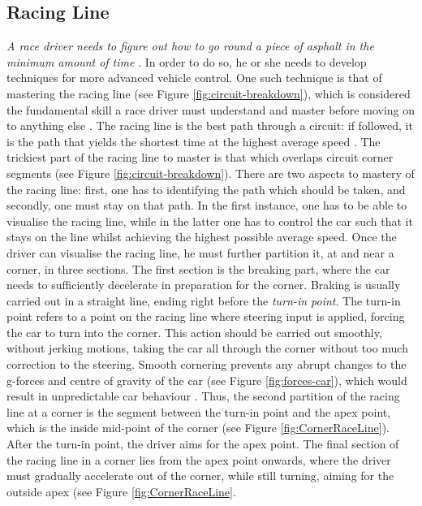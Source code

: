 \subsection{Racing Line}
\emph{A race driver needs to figure out how to go round a piece of asphalt in the minimum amount of time} \cite{GoingFaster}. In order to do so, he or she needs to develop techniques for more advanced vehicle control. One such technique is that of mastering the racing line (see Figure \ref{fig:circuit-breakdown}), which is considered the fundamental skill a race driver must understand and master before moving on to anything else \cite{GoingFaster}. The racing line is the best path through a circuit: if followed, it is the path that yields the shortest time at the highest average speed \cite{beckman1991physics}. The trickiest part of the racing line to master is that which overlaps circuit corner segments (see Figure \ref{fig:circuit-breakdown}). There are two aspects to mastery of the racing line: first, one has to identifying the path which should be taken, and secondly, one must stay on that path. In the first instance, one has to be able to visualise the racing line, while in the latter one has to control the car such that it stays on the line whilst achieving the highest possible average speed. Once the driver can visualise the racing line, he must further partition it, at and near a corner, in three sections. The first section is the breaking part, where the car needs to sufficiently decelerate in preparation for the corner. Braking is usually carried out in a straight line, ending right before the \emph{turn-in point}. The turn-in point refers to a point on the racing line where steering input is applied, forcing the car to turn into the corner. This action should be carried out smoothly, without jerking motions, taking the car all through the corner without too much correction to the steering. Smooth cornering prevents any abrupt changes to the g-forces and centre of gravity of the car (see Figure \ref{fig:forces-car}), which would result in unpredictable car behaviour \cite{GoingFaster}. Thus, the second partition of the racing line at a corner is the segment between the turn-in point and the apex point, which is the inside mid-point of the corner (see Figure \ref{fig:CornerRaceLine}). After the turn-in point, the driver aims for the apex point. The final section of the racing line in a corner lies from the apex point onwards, where the driver must gradually accelerate out of the corner, while still turning, aiming for the outside apex (see Figure \ref{fig:CornerRaceLine}.

